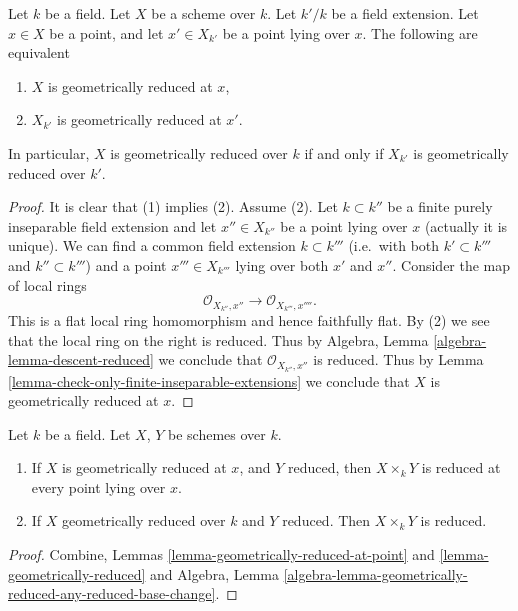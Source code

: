 \begin{lemma}
\label{lemma-geometrically-reduced-upstairs}
Let $k$ be a field.
Let $X$ be a scheme over $k$.
Let $k'/k$ be a field extension.
Let $x \in X$ be a point, and let $x' \in X_{k'}$ be a point lying over $x$.
The following are equivalent
\begin{enumerate}
\item $X$ is geometrically reduced at $x$,
\item $X_{k'}$ is geometrically reduced at $x'$.
\end{enumerate}
In particular, $X$ is geometrically reduced over $k$ if and only if
$X_{k'}$ is geometrically reduced over $k'$.
\end{lemma}

\begin{proof}
It is clear that (1) implies (2). Assume (2).
Let $k \subset k''$ be a finite purely inseparable field extension
and let $x'' \in X_{k''}$ be a point lying over $x$ (actually it is
unique). We can find a common field extension $k \subset k'''$
(i.e.\ with both $k' \subset k'''$ and $k'' \subset k'''$) and a point
$x''' \in X_{k'''}$ lying over both $x'$ and $x''$.
Consider the map of local rings
$$
\mathcal{O}_{X_{k''}, x''} \longrightarrow \mathcal{O}_{X_{k'''}, x''''}.
$$
This is a flat local ring homomorphism and hence faithfully flat.
By (2) we see that the local ring on the right is reduced.
Thus by Algebra, Lemma \ref{algebra-lemma-descent-reduced}
we conclude that $\mathcal{O}_{X_{k''}, x''}$ is reduced.
Thus by Lemma \ref{lemma-check-only-finite-inseparable-extensions}
we conclude that $X$ is geometrically reduced at $x$.
\end{proof}

\begin{lemma}
\label{lemma-geometrically-reduced-any-base-change}
Let $k$ be a field.
Let $X$, $Y$ be schemes over $k$.
\begin{enumerate}
\item If $X$ is geometrically reduced at $x$, and $Y$ reduced,
then $X \times_k Y$ is reduced at every point lying over $x$.
\item If $X$ geometrically reduced over $k$ and $Y$ reduced.
Then $X \times_k Y$ is reduced.
\end{enumerate}
\end{lemma}

\begin{proof}
Combine, Lemmas \ref{lemma-geometrically-reduced-at-point}
and \ref{lemma-geometrically-reduced} and Algebra,
Lemma \ref{algebra-lemma-geometrically-reduced-any-reduced-base-change}.
\end{proof}

